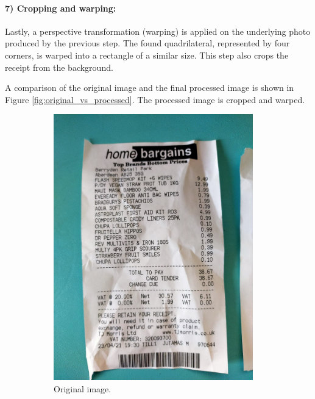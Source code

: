 \documentclass[
  digital, %
  table,   %
  oneside, %
  lof,     %
  lot,     %
]{fithesis3}
\begin{document}
\paragraph{7) Cropping and warping:} Lastly, a perspective transformation (warping) is applied on the underlying photo produced by the previous step.
The found quadrilateral, represented by four corners, is warped into a rectangle of a similar size. This step also crops the receipt from the background. 

A comparison of the original image and the final processed image is shown in Figure \ref{fig:original_vs_processed}. The processed image is cropped and warped.

\begin{figure}
    \centering
    \begin{subfigure}[t]{0.5\textwidth}
      \centering
      \includegraphics[width=0.95\textwidth]{figures/image_processing/original_image}
      \caption{Original image.}
    \end{subfigure}
    \begin{subfigure}[t]{0.5\textwidth}

\end{subfigure}
\end{figure}
\end{document}
